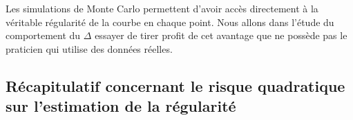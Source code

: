 Les simulations de Monte Carlo permettent d'avoir accès directement à la véritable régularité de la courbe en chaque point. Nous allons dans l'étude du comportement du $\Delta$ essayer de tirer profit de cet avantage que ne possède pas le praticien qui utilise des données réelles.


\subsection{Récapitulatif concernant le risque quadratique sur l'estimation de la régularité}

